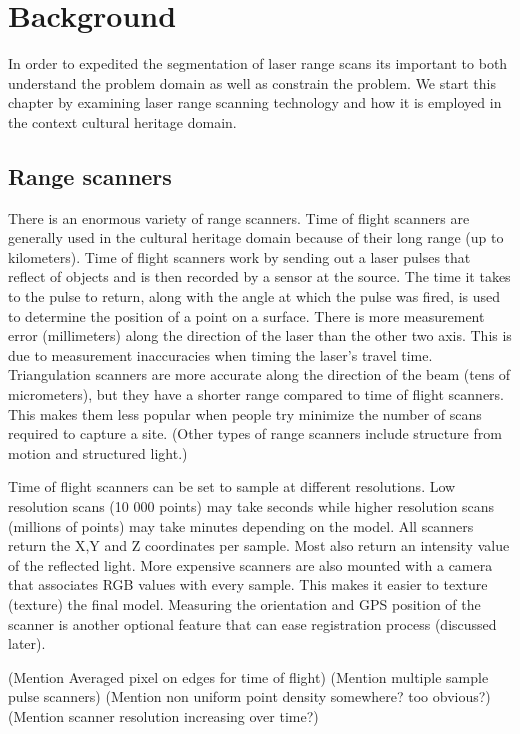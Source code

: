 \chapter{Background} \label{ch2}

In order to expedited the segmentation of laser range scans its important to both understand the problem domain as well as constrain the problem. We start this chapter by examining laser range scanning technology and how it is employed in the context cultural heritage domain.

\section{Range scanners}

There is an enormous variety of range scanners. Time of flight scanners are generally used in the cultural heritage domain because of their long range (up to kilometers). Time of flight scanners work by sending out a laser pulses that reflect of objects and is then recorded by a sensor at the source. The time it takes to the pulse to return, along with the angle at which the pulse was fired, is used to determine the position of a point on a surface. There is more measurement error (millimeters) along the direction of the laser than the other two axis. This is due to measurement inaccuracies when timing the laser's travel time. Triangulation scanners are more accurate along the direction of the beam (tens of micrometers), but they have a shorter range compared to time of flight scanners. This makes them less popular when people try minimize the number of scans required to capture a site. (Other types of range scanners include structure from motion and structured light.)

Time of flight scanners can be set to sample at different resolutions. Low resolution scans (10 000 points) may take seconds while higher resolution scans (millions of points) may take minutes depending on the model. All scanners return the X,Y and Z coordinates per sample. Most also return an intensity value of the reflected light. More expensive scanners are also mounted with a camera that associates RGB values with every sample. This makes it easier to texture (texture) the final model. Measuring the orientation and GPS position of the scanner is another optional feature that can ease registration process (discussed later).

(Mention Averaged pixel on edges for time of flight)
(Mention multiple sample pulse scanners)
(Mention non uniform point density somewhere? too obvious?)
(Mention scanner resolution increasing over time?)

